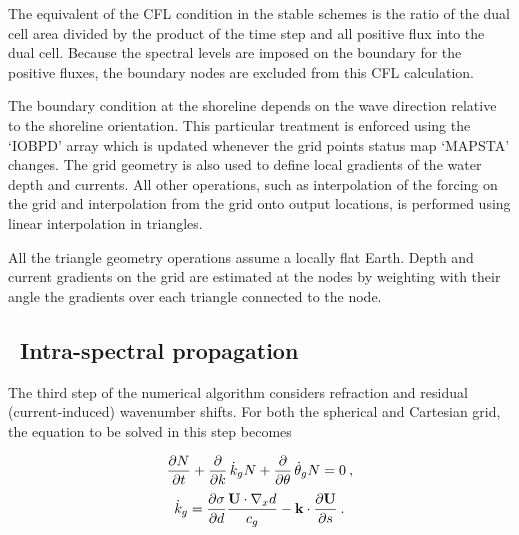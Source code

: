 The equivalent of the CFL condition in the stable schemes is the ratio of the dual cell area divided 
by the product of the time step and all positive flux into the dual cell. Because the spectral levels 
are imposed on the boundary for the positive fluxes, the boundary nodes are excluded from this 
CFL calculation. 

 The boundary condition at the shoreline depends on the 
wave direction relative to the shoreline orientation. This particular treatment is enforced using the `{\F IOBPD}' array 
which is updated whenever the grid points status map `{\F MAPSTA}' changes. The grid geometry is also used to define 
local gradients of the water depth and currents. All other operations, such as interpolation of the forcing 
on the grid and interpolation from the grid onto output locations, is performed using linear interpolation in triangles. 

All the triangle geometry operations assume a locally flat Earth. Depth and current gradients on 
the grid are estimated at the nodes by weighting with their angle the gradients over each 
triangle connected to the node. 



\vssub
\subsection{~Intra-spectral propagation}
\vssub

The third step of the numerical algorithm considers refraction and residual
(current-induced) wavenumber shifts. For both the spherical and Cartesian
grid, the equation to be solved in this step becomes


\begin{equation}
\frac{\partial N}{\partial t} + \frac{\partial}{\partial k} \, \dot{k}_g N +
\frac{\partial}{\partial \theta} \, \dot{\theta}_g N = 0
\: , \label{eq:step_intra} \end{equation} \begin{equation}
\dot{k}_g  = \frac{\partial \sigma}{\partial d} 
    \frac{{\bf U} \cdot \nabla_x d}{c_g}  -
    {\bf k} \cdot \frac{\partial {\bf U}}{\partial s}
\: . \label{eq:k_dot_g} \end{equation}

